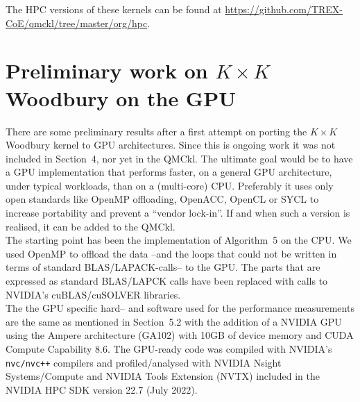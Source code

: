 \documentclass[11pt]{article}
\numberwithin{figure}{section}
\numberwithin{table}{section}
\begin{document}
    The HPC versions of these kernels can be found at \url{https://github.com/TREX-CoE/qmckl/tree/master/org/hpc}.
  
  \section{Preliminary work on $K\times K$ Woodbury on the GPU}
    There are some preliminary results after a first attempt on porting the $K\times K$ Woodbury kernel to GPU architectures. Since this is ongoing work it was not included in Section~4, nor yet in the QMCkl. The ultimate goal would be to have a GPU implementation that performs faster, on a general GPU architecture,  under typical workloads, than on a (multi-core) CPU. Preferably it uses only open standards like OpenMP offloading, OpenACC, OpenCL or SYCL to increase portability and prevent a ``vendor lock-in''. If and when such a version is realised, it can be added to the QMCkl.\\
      
    The starting point has been the implementation of Algorithm~5 on the CPU. We used OpenMP to offload the data --and the loops that could not be written in terms of standard BLAS/LAPACK-calls-- to the GPU. The parts that are expressed as standard BLAS/LAPCK calls have been replaced with calls to NVIDIA's cuBLAS/cuSOLVER libraries.\\
    
    The the GPU specific hard-- and software used for the performance measurements are the same as mentioned in Section~5.2 with the addition of a NVIDIA GPU using the Ampere architecture (GA102) with 10GB of device memory and CUDA Compute Capability 8.6. The GPU-ready code was compiled with NVIDIA's \texttt{nvc/nvc++} compilers and profiled/analysed with NVIDIA Nsight Systems/Compute and NVIDIA Tools Extension (NVTX) included in the NVIDIA HPC SDK version 22.7 (July 2022).
  
\end{document}
